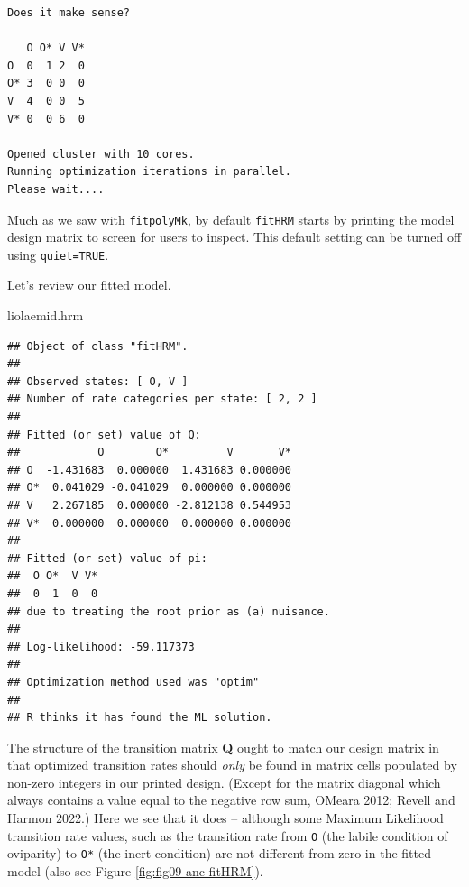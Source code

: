 \documentclass[fleqn,10pt,lineno]{wlpeerj} %
\newenvironment{Shaded}{\begin{snugshade}}{\end{snugshade}}
\newcommand{\NormalTok}[1]{#1}
\begin{document}
\begin{verbatim}
Does it make sense?

   O O* V V*
O  0  1 2  0
O* 3  0 0  0
V  4  0 0  5
V* 0  0 6  0

Opened cluster with 10 cores.
Running optimization iterations in parallel.
Please wait....
\end{verbatim}

Much as we saw with \texttt{fitpolyMk}, by default \texttt{fitHRM} starts by printing the model design matrix to screen for users to inspect. This default setting can be turned off using \texttt{quiet=TRUE}.

Let's review our fitted model.

\begin{Shaded}
\begin{Highlighting}[]
\NormalTok{liolaemid.hrm}
\end{Highlighting}
\end{Shaded}

\begin{verbatim}
## Object of class "fitHRM".
## 
## Observed states: [ O, V ]
## Number of rate categories per state: [ 2, 2 ]
## 
## Fitted (or set) value of Q:
##            O        O*         V       V*
## O  -1.431683  0.000000  1.431683 0.000000
## O*  0.041029 -0.041029  0.000000 0.000000
## V   2.267185  0.000000 -2.812138 0.544953
## V*  0.000000  0.000000  0.000000 0.000000
## 
## Fitted (or set) value of pi:
##  O O*  V V* 
##  0  1  0  0 
## due to treating the root prior as (a) nuisance.
## 
## Log-likelihood: -59.117373 
## 
## Optimization method used was "optim"
## 
## R thinks it has found the ML solution.
\end{verbatim}

The structure of the transition matrix \textbf{Q} ought to match our design matrix in that optimized transition rates should \emph{only} be found in matrix cells populated by non-zero integers in our printed design. (Except for the matrix diagonal which always contains a value equal to the negative row sum, OMeara 2012; Revell and Harmon 2022.) Here we see that it does -- although some Maximum Likelihood transition rate values, such as the transition rate from \texttt{O} (the labile condition of oviparity) to \texttt{O*} (the inert condition) are not different from zero in the fitted model (also see Figure \ref{fig:fig09-anc-fitHRM}).
\end{document}
